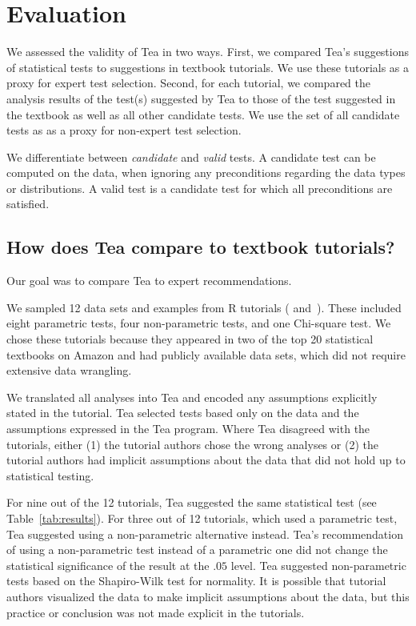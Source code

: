 
\section{Evaluation} \label{sec:eval}
We assessed the validity of Tea in two ways. First, we compared Tea's
suggestions of statistical tests to suggestions in textbook tutorials.
We use these tutorials as a proxy for expert test selection.
Second, for each tutorial, we compared the analysis results of the test(s)
suggested by Tea to those of the test suggested in the textbook as well as all
other candidate tests. We use the set of all candidate tests as as a proxy for
non-expert test selection.

We differentiate between \textit{candidate} and \textit{valid} tests. A candidate test can be
computed on the data, when ignoring any preconditions regarding the data types or
distributions. A valid test is a candidate test for which all preconditions are
satisfied.

\subsection{How does Tea compare to textbook tutorials?}
Our goal was to compare Tea to expert recommendations.

We sampled 12 data sets and examples from R tutorials (\cite{kabacoff2011action}
and~\cite{field2012discoveringR}). These included eight parametric tests, four
non-parametric tests, and one Chi-square test. We chose these tutorials because they
appeared in two of the top 20 statistical textbooks on Amazon and had publicly available
data sets, which did not require extensive data wrangling.

We translated all analyses into Tea and encoded any assumptions explicitly
stated in the tutorial. Tea selected tests based only on the data and the
assumptions expressed in the Tea program. Where Tea disagreed with the
tutorials, either (1) the tutorial authors chose the wrong analyses or (2) the tutorial authors
had implicit assumptions about the data that did not hold up to statistical testing. 

For nine out of the 12 tutorials, Tea suggested the same statistical test (see
Table~\ref{tab:results}). For three out of 12 tutorials, which used a parametric
test, Tea suggested using a non-parametric alternative instead. Tea's
recommendation of using a non-parametric test instead of a parametric one did
not change the statistical significance of the result at the $.05$ level. Tea
suggested non-parametric tests based on the Shapiro-Wilk test for normality. It
is possible that tutorial authors visualized the data to make implicit
assumptions about the data, but this practice or conclusion was not made
explicit in the tutorials.

